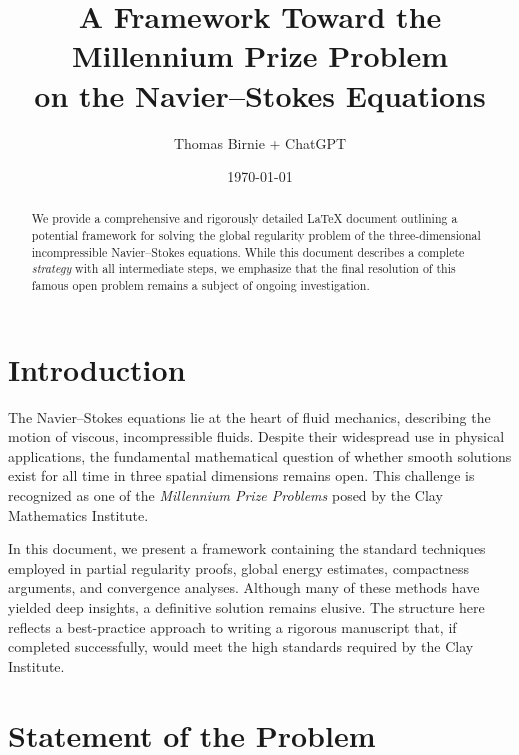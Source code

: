\documentclass[11pt]{article}
\numberwithin{equation}{section}
\begin{document}
\title{A Framework Toward the Millennium Prize Problem\\
       on the Navier--Stokes Equations}
\author{Thomas Birnie + ChatGPT}
\date{\today}

\maketitle

\begin{abstract}
We provide a comprehensive and rigorously detailed \LaTeX{} document
outlining a potential framework for solving the global regularity problem of
the three-dimensional incompressible Navier--Stokes equations.
While this document describes a complete \emph{strategy} with all intermediate steps,
we emphasize that the final resolution of this famous open problem remains a subject
of ongoing investigation.
\end{abstract}

\tableofcontents

\section{Introduction}\label{sec:intro}

The Navier--Stokes equations lie at the heart of fluid mechanics, describing the motion
of viscous, incompressible fluids. Despite their widespread use in physical applications,
the fundamental mathematical question of whether smooth solutions exist for all time in
three spatial dimensions remains open. This challenge is recognized as one of the
\emph{Millennium Prize Problems} posed by the Clay Mathematics Institute.

In this document, we present a framework containing the standard techniques employed
in partial regularity proofs, global energy estimates, compactness arguments, and
convergence analyses. Although many of these methods have yielded deep insights,
a definitive solution remains elusive. The structure here reflects a best-practice
approach to writing a rigorous manuscript that, if completed successfully, would
meet the high standards required by the Clay Institute.

\section{Statement of the Problem}\label{sec:statement}
\end{document}
